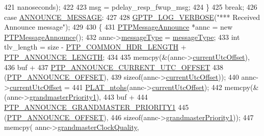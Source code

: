 \begin{DoxyCode}
{{{{{{{{421                  nanoseconds);
422 
423             msg = pdelay\_resp\_fwup\_msg;
424         \}
425         \textcolor{keywordflow}{break};
426     \textcolor{keywordflow}{case} \hyperlink{avbts__message_8hpp_ac6606ebe91c8ac66a2c314c79f5ab013a4c8d615c4de8a7fc2ea24b5eff2811ef}{ANNOUNCE\_MESSAGE}:
427 
428         \hyperlink{gptp__log_8hpp_add03384a2a8099b27e07d041cce77e6f}{GPTP\_LOG\_VERBOSE}(\textcolor{stringliteral}{"*** Received Announce message"});
429 
430         \{
431             \hyperlink{class_p_t_p_message_announce}{PTPMessageAnnounce} *annc = \textcolor{keyword}{new} \hyperlink{class_p_t_p_message_announce_a0c29a3fa8d36a2ccdb248bbb7c433161}{PTPMessageAnnounce}();
432             annc->\hyperlink{class_p_t_p_message_common_adb32627aa5b0e2dbad3ccd88aab07c05}{messageType} = \hyperlink{class_p_t_p_message_common_adb32627aa5b0e2dbad3ccd88aab07c05}{messageType};
433             \textcolor{keywordtype}{int} tlv\_length = size - \hyperlink{avbts__message_8hpp_a8ec4d965b7b1e83844f1c17f12e9b8e4}{PTP\_COMMON\_HDR\_LENGTH} + 
      \hyperlink{avbts__message_8hpp_ad800b5cd5359d021054af8e902100ba7}{PTP\_ANNOUNCE\_LENGTH};
434 
435             memcpy(&(annc->\hyperlink{class_p_t_p_message_announce_a4ee8eca04b1ccd7d8eaae5f0dd3a11fa}{currentUtcOffset}),
436                    buf +
437                    \hyperlink{avbts__message_8hpp_acd887e469bb001b97f8eef87a997ae59}{PTP\_ANNOUNCE\_CURRENT\_UTC\_OFFSET}
438                    (\hyperlink{avbts__message_8hpp_aaa3da4fa4e9e4cfe49477cd7f6b95bca}{PTP\_ANNOUNCE\_OFFSET}),
439                    \textcolor{keyword}{sizeof}(annc->\hyperlink{class_p_t_p_message_announce_a4ee8eca04b1ccd7d8eaae5f0dd3a11fa}{currentUtcOffset}));
440             annc->\hyperlink{class_p_t_p_message_announce_a4ee8eca04b1ccd7d8eaae5f0dd3a11fa}{currentUtcOffset} =
441                 \hyperlink{linux_2src_2platform_8cpp_a6b8f3e7b87b66fa774a07ddc67f883a7}{PLAT\_ntohs}(annc->\hyperlink{class_p_t_p_message_announce_a4ee8eca04b1ccd7d8eaae5f0dd3a11fa}{currentUtcOffset});
442             memcpy(&(annc->\hyperlink{class_p_t_p_message_announce_a93988c82dd819cc976c32f9e006b97e3}{grandmasterPriority1}),
443                    buf +
444                    \hyperlink{avbts__message_8hpp_acd2f076b6ef0a6a45ac42baf1aecd300}{PTP\_ANNOUNCE\_GRANDMASTER\_PRIORITY1}
445                    (\hyperlink{avbts__message_8hpp_aaa3da4fa4e9e4cfe49477cd7f6b95bca}{PTP\_ANNOUNCE\_OFFSET}),
446                    \textcolor{keyword}{sizeof}(annc->\hyperlink{class_p_t_p_message_announce_a93988c82dd819cc976c32f9e006b97e3}{grandmasterPriority1}));
447             memcpy( annc->\hyperlink{class_p_t_p_message_announce_aa67cf6cb88ed67b2850993312a7cd5f2}{grandmasterClockQuality},
}}}}}}}}
\end{DoxyCode}
